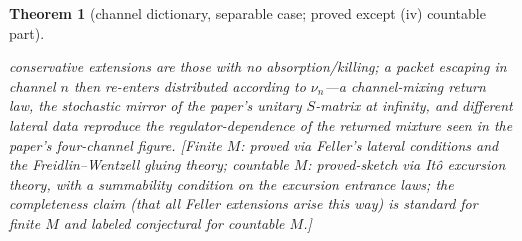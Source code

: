 \documentclass[11pt]{article}
\newtheorem{theorem}{Theorem}
\theoremstyle{remark}
\begin{document}
\begin{theorem}[channel dictionary, separable case; proved except (iv)
countable part]
\begin{itemize}
conservative extensions are those with no absorption/killing; a packet
escaping in channel $n$ then re-enters distributed according to
$\nu_{n}$---a channel-\emph{mixing} return law, the stochastic mirror
of the paper's unitary $S$-matrix at infinity, and different lateral
data reproduce the regulator-dependence of the returned mixture seen in
the paper's four-channel figure.  \emph{[Finite $M$: proved via
Feller's lateral conditions and the Freidlin--Wentzell gluing theory;
countable $M$: proved-sketch via It\^o excursion theory, with a
summability condition on the excursion entrance laws; the
\emph{completeness} claim (that all Feller extensions arise this way)
is standard for finite $M$ and labeled conjectural for countable
$M$.]}
\end{itemize}
\end{theorem}
\end{document}

